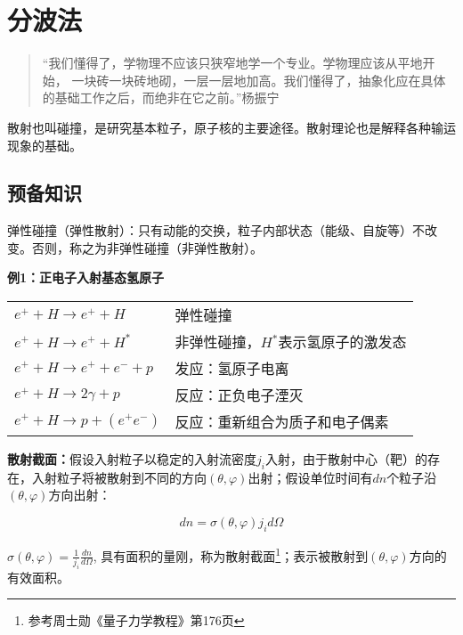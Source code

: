 \section{分波法}

\begin{quotation}
``我们懂得了，学物理不应该只狭窄地学一个专业。学物理应该从平地开始，
一块砖一块砖地砌，一层一层地加高。我们懂得了，抽象化应在具体的基础工作之后，而绝非在它之前。''\qquad 杨振宁
\end{quotation}


散射也叫碰撞，是研究基本粒子，原子核的主要途径。散射理论也是解释各种输运现象的基础。

\subsection{预备知识}

弹性碰撞（弹性散射）：只有动能的交换，粒子内部状态（能级、自旋等）不改变。否则，称之为非弹性碰撞（非弹性散射）。

\textbf{例1：正电子入射基态氢原子}

\begin{tabular}{|l|l|}
  \hline
  $e^ +   + H \to e^ +   + H$ & 弹性碰撞 \\
  $e^ +   + H \to e^ +   + H^* $ & 非弹性碰撞，$H{}^*$表示氢原子的激发态 \\
  $e^ +   + H \to e^ +   + e^ -   + p$ & 发应：氢原子电离 \\
  $e^ +   + H \to 2\gamma  + p$ & 反应：正负电子湮灭 \\
  $e^ +   + H \to p + \left( {e^ +  e^ -  } \right)$ & 反应：重新组合为质子和电子偶素 \\
  \hline
 \end{tabular}


\textbf{散射截面：}假设入射粒子以稳定的入射流密度$j_i$入射，由于散射中心（靶）的存在，入射粒子将被散射到不同的方向$\left( {\theta ,\varphi } \right)$出射；假设单位时间有$dn$个粒子沿$\left( {\theta ,\varphi } \right)$方向出射：



\begin{equation}\label{26-1}
dn = \sigma \left( {\theta ,\varphi } \right)j_i d\Omega
\end{equation}

$\sigma \left( {\theta ,\varphi } \right) = \frac{1}{{j_i }}\frac{{dn}}{{d\Omega }}$, 具有面积的量刚，称为散射截面\footnote{参考周士勋《量子力学教程》第176页}；表示被散射到$\left( {\theta ,\varphi } \right)$方向的有效面积。

